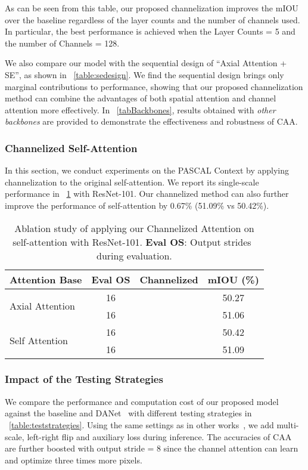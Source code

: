 \documentclass[letterpaper]{article} \usepackage{aaai22}  \usepackage{times}  \usepackage{helvet}  \usepackage{courier}  \usepackage[hyphens]{url}  \usepackage{graphicx} \urlstyle{rm} \def\UrlFont{\rm}  \usepackage{natbib}  \usepackage{caption} \DeclareCaptionStyle{ruled}{labelfont=normalfont,labelsep=colon,strut=off} \frenchspacing  \setlength{\pdfpagewidth}{8.5in}  \setlength{\pdfpageheight}{11in}  \usepackage{algorithm}
\begin{document}
As can be seen from this table, our proposed channelization improves the mIOU over the baseline regardless of the layer counts and the number of channels used. 
In particular, the best performance is achieved when the Layer Counts = 5 and the number of Channels = 128. 

We also compare our model with the sequential design of ``Axial Attention + SE'', as shown in \tablename{~\ref{table:sedesign}}. 
We find the sequential design brings only marginal contributions to performance, showing that our proposed channelization method can combine the advantages of both spatial attention and channel attention more effectively. 
In \tablename{~\ref{tabBackbones}}, results obtained with \textit{other backbones} are provided to demonstrate the effectiveness and robustness of CAA.

\subsubsection{Channelized Self-Attention}
In this section, we conduct experiments on the PASCAL Context by applying channelization to the original self-attention. 
We report its single-scale performance in~\tablename{ \ref{tabCSA}} with ResNet-101. 
Our channelized method can also further improve the performance of self-attention by 0.67\% (51.09\% vs 50.42\%).


\begin{table}[t]
	\centering
	\small
	\begin{tabular}{l|c|c|c} 
		\toprule
		Attention Base                    & Eval OS & Channelized     & mIOU (\%)   \\
		\midrule[0.5pt]
		\midrule[0.5pt]
		\multirow{2}{*}{Axial Attention  }& 16       &             & 50.27  \\
		& 16  	 & \checkmark  & 51.06  \\
		\midrule
		\multirow{2}{*}{  Self Attention} & 16  	 &             & 50.42  \\
		& 16  	 & \checkmark  & 51.09  \\
		\bottomrule[0.5pt]
	\end{tabular}
	\caption{Ablation study of applying our Channelized Attention on self-attention with ResNet-101. \textbf{Eval OS}: Output strides~\cite{cDeepLabV3Plus} during evaluation.}
	\label{tabCSA}
\end{table}

\subsubsection{Impact of the Testing Strategies} 
We compare the performance and computation cost of our proposed model against the baseline and DANet~\cite{cDualAttention} with different testing strategies in \tablename{~\ref{table:teststrategies}}.
Using the same settings as in other works~\cite{cDualAttention}, we add multi-scale, left-right flip and auxiliary loss during inference. 
The accuracies of CAA are further boosted with output stride = 8 since the channel attention can learn and optimize three times more pixels.
\end{document}
